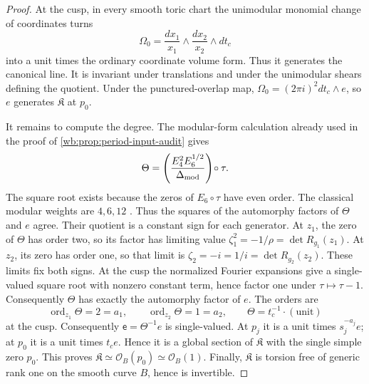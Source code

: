 \begin{proof}
At the cusp, in every smooth toric chart the unimodular monomial change of
coordinates turns
\[
 \Omega_0=\frac{dx_1}{x_1}\wedge
          \frac{dx_2}{x_2}\wedge dt_c
\]
into a unit times the ordinary coordinate volume form.  Thus it generates
the canonical line.  It is invariant under translations and under the
unimodular shears defining the quotient.  Under the punctured-overlap map,
\(\Omega_0=(2\pi i)^2dt_c\wedge e\), so \(e\) generates
\(\mathfrak K\) at \(p_0\).

It remains to compute the degree.  The modular-form calculation already
used in the proof of \cref{wb:prop:period-input-audit} gives
\[
 \Theta=
 \left(\frac{E_4^2E_6^{1/2}}{\Delta_{\rm mod}}\right)\!\circ\tau.
\]
The square root exists because the zeros of \(E_6\circ\tau\) have even
order.  The classical modular weights are $4,6,12$
\cite[Chapter~VII, Theorems~3--4 and Proposition~8]{Serre1973}.
Thus the squares of the automorphy factors of $\Theta$ and $e$ agree.
Their quotient is a constant sign for each generator. At $z_1$, the
zero of $\Theta$ has order two, so its factor has limiting value
$\zeta_1^2=-1/\rho=\det R_{g_1}(z_1)$. At $z_2$, its zero has order
one, so that limit is $\zeta_2=-i=1/i=\det R_{g_2}(z_2)$.
These limits fix both signs. At the cusp the normalized Fourier
expansions give a single-valued square root with nonzero constant
term, hence factor one under $\tau\mapsto\tau-1$.
Consequently $\Theta$ has exactly the automorphy factor of $e$.  The orders are
\[
 \operatorname{ord}_{z_1}\Theta=2=a_1,\qquad
 \operatorname{ord}_{z_2}\Theta=1=a_2,\qquad
 \Theta=t_c^{-1}\cdot(\text{unit})
\tag{HL.9.6}
\]
at the cusp.  Consequently \(\mathsf e=\Theta^{-1}e\) is single-valued.
At \(p_j\) it is a unit times \(s_j^{-a_j}e\); at \(p_0\) it is a unit
times \(t_ce\).  Hence it is a global section of \(\mathfrak K\) with the
single simple zero \(p_0\).  This proves
\(\mathfrak K\simeq\mathcal O_B(p_0)\simeq\mathcal O_B(1)\).
Finally, \(\mathfrak K\) is torsion free of generic rank one on the smooth
curve \(B\), hence is invertible.
\end{proof}
